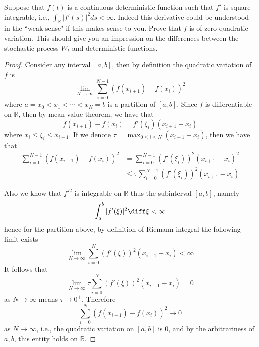 \newcommand{\var}{\mathrm{Var}}

    \problem
    \begin{question}
        Suppose that $f(t)$ is a continuous deterministic function
        such that $f'$ is square integrable, i.e., $\int_{\mathbb R}|f'(s)|^2ds<\infty$.
        Indeed this derivative could be understood in the ``weak sense" if this makes
        sense to you.  Prove that $f$ is of zero quadratic variation.
        This should give you an impression on the differences between the stochastic
        process $W_t$ and deterministic functions.
    \end{question}
    \begin{proof}
        Consider any interval $[a,b]$, then by definition the
        quadratic variation of $f$ is
        \[\lim_{N\to\infty}\sum_{i=0}^{N-1} (f(x_{i+1})-f(x_i))^2\]
        where $a=x_0<x_1<\cdots<x_N=b$ is a partition of $[a,b]$.
        Since $f$ is differentiable on $\mathbb R$, then by mean
        value theorem, we have that
        \[f(x_{i+1})-f(x_i)=f'(\xi_i)(x_{i+1}-x_i)\]
        where $x_i\leq \xi_i\leq x_{i+1}$.
        If we denote $\tau=\max_{0\leq i\leq N}(x_{i+1}-x_i)$,
        then we have that
        \[\begin{aligned}
            \sum_{i=0}^{N-1}(f(x_{i+1})-f(x_i))^2
            &=\sum_{i=0}^{N-1}(f'(\xi_i))^2(x_{i+1}-x_i)^2\\
            &\leq\tau\sum_{i=0}^{N-1}(f'(\xi_i))^2(x_{i+1}-x_i)
        \end{aligned}\]

        Also we know that $f'^2$ is integrable on $\mathbb R$
        thus the subinterval $[a,b]$, namely
        \[\int_a^b|f'(\xi)|^2\diff\xi<\infty\]
        hence for the partition above, by definition of Riemann
        integral the following limit exists
        \[\lim_{N\to\infty}\sum_{i=0}^N(f'(\xi))^2(x_{i+1}-x_i)
        <\infty\]
        It follows that
        \[\lim_{N\to\infty}\tau\sum_{i=0}^N(f'(\xi))^2(x_{i+1}-x_i)
        =0\]
        as $N\to\infty$ means $\tau\to 0^+$. Therefore
        \[\sum_{i=0}^N(f(x_{i+1})-f(x_i))^2\to 0\]
        as $N\to\infty$, i.e., the quadratic variation on $[a,b]$
        is 0, and by the arbitrariness of $a,b$, this entity holds
        on $\mathbb R$.
    \end{proof}

